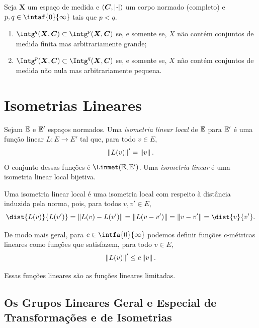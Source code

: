 \begin{prop}
Seja $\bm X$ um espaço de medida e $(\bm C,\left\vert{\bm{\cdot}}\right\vert)$ um corpo normado (completo) e $p,q \in \intaf{0}{\infty}$ tais que $p < q$.
	\begin{enumerate}
	\item $\Intg^q(\bm X,\bm C) \subset \Intg^p(\bm X,\bm C)$ se, e somente se, $X$ não contém conjuntos de medida finita mas arbitrariamente grande;
	
	\item $\Intg^p(\bm X,\bm C) \subset \Intg^q(\bm X,\bm C)$ se, e somente se, $X$ não contém conjuntos de medida não nula mas arbitrariamente pequena.
	\end{enumerate}
\end{prop}




\section{Isometrias Lineares}

\begin{defi}
Sejam $\mathbb{E}$ e $\mathbb{E}'$ espaços normados. Uma \emph{isometria linear local} de $\mathbb{E}$ para $\mathbb{E}'$ é uma função linear $L\colon E \to E'$ tal que, para todo $v \in E$,
	\begin{equation*}
	\left\Vert{L(v)}\right\Vert' = \left\Vert{v}\right\Vert.
	\end{equation*}
O conjunto dessas funções é $\Linmet(\E,\E')$. Uma \emph{isometria linear} é uma isometria linear local bijetiva.
\end{defi}

Uma isometria linear local é uma isometria local com respeito à distância induzida pela norma, pois, para todos $v,v' \in E$,
	\begin{equation*}
	\dist{L(v)}{L(v')} = \nor{L(v) - L(v')} = \nor{L(v - v')} = \nor{v - v'} = \dist{v}{v'}.
	\end{equation*}

De modo mais geral, para $c \in \intfa{0}{\infty}$ podemos definir funções $c$-métricas lineares como funções que satisfazem, para todo $v \in E$,
	\begin{equation*}
	\left\Vert{L(v)}\right\Vert' \leq c \left\Vert{v}\right\Vert.
	\end{equation*}

Essas funções lineares são as funções lineares limitadas.



\subsection{Os Grupos Lineares Geral e Especial de Transformações e de Isometrias}

